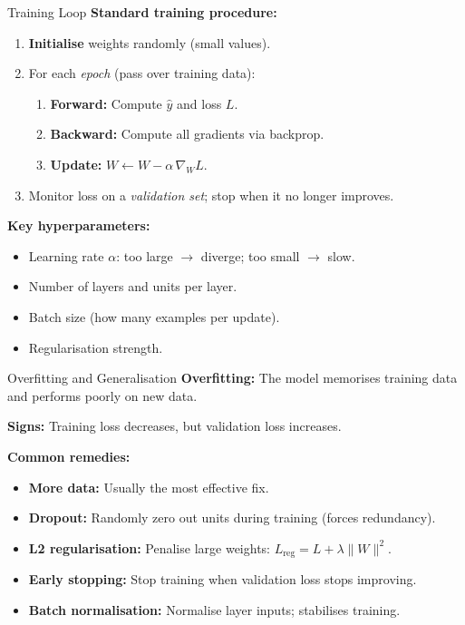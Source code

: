 \documentclass[10pt]{beamer}
\begin{document}
\begin{frame}{Training Loop}
    \textbf{Standard training procedure:}
    \begin{enumerate}
        \item \textbf{Initialise} weights randomly (small values).
        \item For each \emph{epoch} (pass over training data):
        \begin{enumerate}
            \item \textbf{Forward:} Compute $\hat{y}$ and loss $L$.
            \item \textbf{Backward:} Compute all gradients via backprop.
            \item \textbf{Update:} $W \gets W - \alpha\,\nabla_W L$.
        \end{enumerate}
        \item Monitor loss on a \emph{validation set}; stop when it no longer improves.
    \end{enumerate}

    \vspace{0.2cm}
    \textbf{Key hyperparameters:}
    \begin{itemize}
        \item Learning rate $\alpha$: too large $\to$ diverge; too small $\to$ slow.
        \item Number of layers and units per layer.
        \item Batch size (how many examples per update).
        \item Regularisation strength.
    \end{itemize}
\end{frame}

\begin{frame}{Overfitting and Generalisation}
    \textbf{Overfitting:} The model memorises training data and performs poorly on new data.

    \vspace{0.2cm}
    \textbf{Signs:} Training loss decreases, but validation loss increases.

    \vspace{0.2cm}
    \textbf{Common remedies:}
    \begin{itemize}
        \item \textbf{More data:} Usually the most effective fix.
        \item \textbf{Dropout:} Randomly zero out units during training (forces redundancy).
        \item \textbf{L2 regularisation:} Penalise large weights: $L_{\text{reg}} = L + \lambda \|W\|^2$.
        \item \textbf{Early stopping:} Stop training when validation loss stops improving.
        \item \textbf{Batch normalisation:} Normalise layer inputs; stabilises training.
    \end{itemize}
\end{frame}
\end{document}
